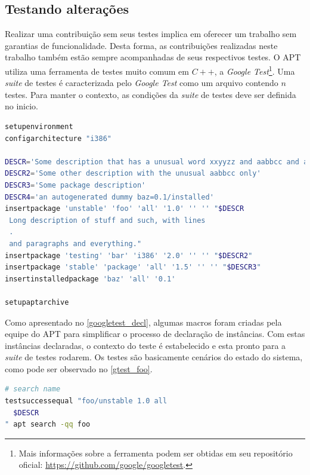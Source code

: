 
\subsection*{Testando alterações} %

Realizar uma contribuição sem seus testes implica em oferecer um trabalho sem garantias de funcionalidade. Desta forma, as contribuições realizadas neste trabalho também estão sempre acompanhadas de seus respectivos testes. O APT utiliza uma ferramenta de testes muito comum em $C++$, a \textit{Google Test}\footnote{Mais informações sobre a ferramenta podem ser obtidas em seu repositório oficial: \url{https://github.com/google/googletest}.}. Uma \textit{suite} de testes é caracterizada pelo \textit{Google Test} como um arquivo contendo $n$ testes. Para manter o contexto, as condições da \textit{suite} de testes deve ser definida no inicio.

\begin{lstlisting}[language=Bash,label=googletest_decl,caption={Declarações de instâncias para o teste}]
setupenvironment
configarchitecture "i386"

DESCR='Some description that has a unusual word xxyyzz and aabbcc and a UPPERCASE'
DESCR2='Some other description with the unusual aabbcc only'
DESCR3='Some package description'
DESCR4='an autogenerated dummy baz=0.1/installed'
insertpackage 'unstable' 'foo' 'all' '1.0' '' '' "$DESCR
 Long description of stuff and such, with lines
 .
 and paragraphs and everything."
insertpackage 'testing' 'bar' 'i386' '2.0' '' '' "$DESCR2"
insertpackage 'stable' 'package' 'all' '1.5' '' '' "$DESCR3"
insertinstalledpackage 'baz' 'all' '0.1'

setupaptarchive
\end{lstlisting}

Como apresentado no \autoref{googletest_decl}, algumas macros foram criadas pela equipe do APT para simplificar o processo de declaração de instâncias. Com estas instâncias declaradas, o contexto do teste é estabelecido e esta pronto para a \textit{suite} de testes rodarem. Os testes são basicamente cenários do estado do sistema, como pode ser observado no \autoref{gtest_foo}.

\begin{lstlisting}[language=Bash,label=gtest_foo,caption={Teste por busca pelo pacote \textit{foo}}]
# search name
testsuccessequal "foo/unstable 1.0 all
  $DESCR
" apt search -qq foo
\end{lstlisting}

